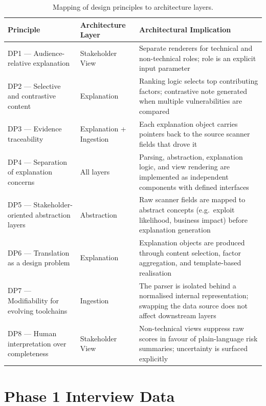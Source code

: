 \begin{table}[h]
\centering
\begin{tabular}{@{}llp{}@{}}
\toprule
\textbf{Principle} & \textbf{Architecture Layer} & \textbf{Architectural Implication} \\
\midrule
DP1 — Audience-relative explanation   & Stakeholder View    & Separate renderers for technical and non-technical roles; role is an explicit input parameter \\
DP2 — Selective and contrastive content & Explanation         & Ranking logic selects top contributing factors; contrastive note generated when multiple vulnerabilities are compared \\
DP3 — Evidence traceability           & Explanation + Ingestion & Each explanation object carries pointers back to the source scanner fields that drove it \\
DP4 — Separation of explanation concerns & All layers         & Parsing, abstraction, explanation logic, and view rendering are implemented as independent components with defined interfaces \\
DP5 — Stakeholder-oriented abstraction layers & Abstraction    & Raw scanner fields are mapped to abstract concepts (e.g.\ exploit likelihood, business impact) before explanation generation \\
DP6 — Translation as a design problem & Explanation         & Explanation objects are produced through content selection, factor aggregation, and template-based realisation \\
DP7 — Modifiability for evolving toolchains & Ingestion       & The parser is isolated behind a normalised internal representation; swapping the data source does not affect downstream layers \\
DP8 — Human interpretation over completeness & Stakeholder View & Non-technical views suppress raw scores in favour of plain-language risk summaries; uncertainty is surfaced explicitly \\
\bottomrule
\end{tabular}
\caption{Mapping of design principles to architecture layers.}
\label{tab:dp-mapping}
\end{table}

\section{Phase 1 Interview Data}
\label{sec:interview-data}

